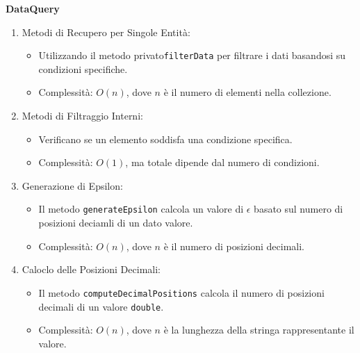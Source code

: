 \textbf{DataQuery}
\begin{enumerate}
    \item Metodi di Recupero per Singole Entità:
    \begin{itemize}
        \item Utilizzando il metodo privato\texttt{filterData} per filtrare i dati basandosi su condizioni specifiche.
        \item Complessità: $O(n)$, dove $n$ è il numero di elementi nella collezione.
    \end{itemize}
    \item Metodi di Filtraggio Interni:
    \begin{itemize}
        \item Verificano se un elemento soddisfa una condizione specifica.
        \item Complessità: $O(1)$, ma totale dipende dal numero di condizioni.
    \end{itemize}
    \item Generazione di Epsilon:
    \begin{itemize}
        \item Il metodo \texttt{generateEpsilon} calcola un valore di $\epsilon$ basato sul numero di posizioni deciamli di un dato valore.
        \item Complessità: $O(n)$, dove $n$ è il numero di posizioni decimali.
    \end{itemize}
    \item Caloclo delle Posizioni Decimali:
    \begin{itemize}
        \item Il metodo \texttt{computeDecimalPositions} calcola il numero di posizioni decimali di un valore \texttt{double}.
        \item Complessità: $O(n)$, dove $n$ è la lunghezza della stringa rappresentante il valore.
    \end{itemize}
\end{enumerate}

